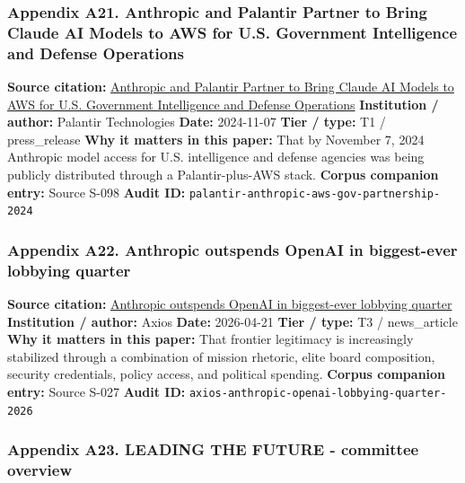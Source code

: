 \documentclass[
  american,
  11pt,
  letterpaper,
]{article}
\begin{document}
\subsubsection{Appendix A21. Anthropic and Palantir Partner to Bring
Claude AI Models to AWS for U.S. Government Intelligence and Defense
Operations}\label{appendix-a21-anthropic-and-palantir-partner-to-bring-claude-ai-models-to-aws-for-u-s-government-intelligence-and-defense-operations}

\textbf{Source citation:}
\href{https://investors.palantir.com/news-details/2024/Anthropic-and-Palantir-Partner-to-Bring-Claude-AI-Models-to-AWS-for-U.S.-Government-Intelligence-and-Defense-Operations/}{Anthropic
and Palantir Partner to Bring Claude AI Models to AWS for U.S.
Government Intelligence and Defense Operations} \textbf{Institution /
author:} Palantir Technologies \textbf{Date:} 2024-11-07 \textbf{Tier /
type:} T1 / press\_release \textbf{Why it matters in this paper:} That
by November 7, 2024 Anthropic model access for U.S. intelligence and
defense agencies was being publicly distributed through a
Palantir-plus-AWS stack. \textbf{Corpus companion entry:} Source S-098
\textbf{Audit ID:} \texttt{palantir-anthropic-aws-gov-partnership-2024}

\subsubsection{Appendix A22. Anthropic outspends OpenAI in biggest-ever
lobbying
quarter}\label{appendix-a22-anthropic-outspends-openai-in-biggest-ever-lobbying-quarter}

\textbf{Source citation:}
\href{https://www.axios.com/2026/04/21/anthropic-outspends-openai-biggest-lobbying-quarter}{Anthropic
outspends OpenAI in biggest-ever lobbying quarter} \textbf{Institution /
author:} Axios \textbf{Date:} 2026-04-21 \textbf{Tier / type:} T3 /
news\_article \textbf{Why it matters in this paper:} That frontier
legitimacy is increasingly stabilized through a combination of mission
rhetoric, elite board composition, security credentials, policy access,
and political spending. \textbf{Corpus companion entry:} Source S-027
\textbf{Audit ID:} \texttt{axios-anthropic-openai-lobbying-quarter-2026}

\subsubsection{Appendix A23. LEADING THE FUTURE - committee
overview}\label{appendix-a23-leading-the-future-committee-overview}
\end{document}
